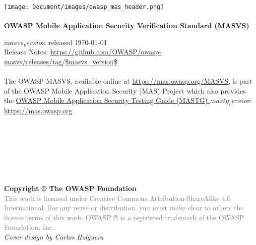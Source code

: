 \thispagestyle{empty} %

\texttt{[image: Document/images/owasp\_mas\_header.png]} \\ \\

\large{\textbf{OWASP Mobile Application Security Verification Standard (MASVS)} }

$masvs_version$ released \today \\

Release Notes: \url{https://github.com/OWASP/owasp-masvs/releases/tag/$masvs_version$} \\ \\


The OWASP MASVS, available online at \url{https://mas.owasp.org/MASVS}, is part of the OWASP Mobile Application Security (MAS) Project which also provides the \href{https://mas.owasp.org/MASTG}{OWASP Mobile Application Security Testing Guide (MASTG) $mastg_version$} \\

\url{https://mas.owasp.org} \\ \\ \\ \\ \\ \\ \\ \\

\textbf{Copyright © The OWASP Foundation} \\

\footnotesize{\textcolor{gray}{This work is licensed under Creative Commons Attribution-ShareAlike 4.0 International. For any reuse or distribution, you must make clear to others the license terms of this work.
OWASP ® is a registered trademark of the OWASP Foundation, Inc.} }\\


\emph{Cover design by Carlos Holguera}